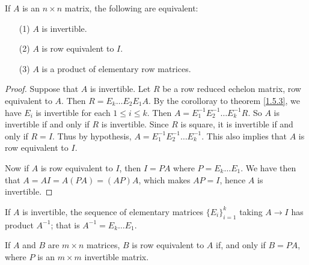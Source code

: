 \begin{theorem}\label{1.5.4}
    If $A$ is an  $n \times n$ matrix, the following are equivalent:
        \begin{enumerate}
            \item[(1)] $A$ is invertible.

            \item[(2)] $A$ is row equivalent to  $I$.

            \item[(3)] $A$ is a product of elementary row matrices.
        \end{enumerate}
\end{theorem}
\begin{proof}
    Suppose that $A$ is invertible. Let $R$ be a row reduced echelon matrix, row equivalent to
    $A$. Then  $R=E_k \dots E_2E_1A$. By the corolloray to theorem \ref{1.5.3}, we have $E_i$ is
    invertible for each $1 \leq i \leq k$. Then  $A=E_1^{-1}E_2^{-1} \dots E_k^{-1}R$. So  $A$
    is invertible if and only if  $R$ is invertible. Since $R$ is square, it is invertible if
    and only if  $R=I$. Thus by hypothesis, $A=E_1^{-1}E_2^{-1} \dots E_k^{-1}$. This also implies
    that $A$ is row equivalent to  $I$.

    Now if  $A$ is row equivalent to  $I$, then  $I=PA$ where  $P=E_k \dots E_1$. We have then that
    $A=AI=A(PA)=(AP)A$, which makes $AP=I$, hence  $A$ is invertible.
\end{proof}
\begin{corollary}
    If $A$ is invertible, the sequence of elementary matrices  $\{E_i\}_{i=1}^k$ taking $A
    \rightarrow I$ has product $A^{-1}$; that is $A^{-1}=E_k \dots E_1$.
\end{corollary}
\begin{corollary}
    If $A$ and  $B$ are  $m \times n$ matrices,  $B$ is row equivalent to  $A$ if, and only if
    $B=PA$, where $P$ is an  $m \times m$ invertible matrix.
\end{corollary}

